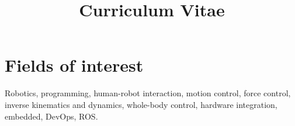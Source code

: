 \documentclass[11pt,a4paper,sans]{moderncv} %
\title{Curriculum Vitae}
\begin{document}
\makecvtitle %


\section{Fields of interest}
Robotics, programming, human-robot interaction, motion control, force control, inverse kinematics and dynamics, whole-body control, hardware integration, embedded, DevOps, ROS.
\end{document}
